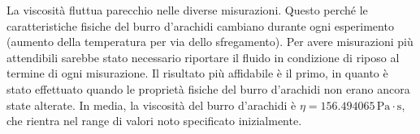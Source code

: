 La viscosit\`{a} fluttua parecchio nelle diverse misurazioni. Questo perch\'{e} le caratteristiche fisiche del burro d'arachidi 
cambiano durante ogni esperimento (aumento della temperatura per via dello sfregamento). Per avere misurazioni pi\`{u} attendibili 
sarebbe stato necessario riportare il fluido in condizione di riposo al termine di ogni misurazione. Il risultato pi\`{u} affidabile 
\`{e} il primo, in quanto \`{e} stato effettuato quando le propriet\`{a} fisiche del burro d'arachidi non erano ancora 
state alterate.
In media, la viscosit\`{a} del burro d'arachidi \`{e} $\eta = 156.494065 \, \text{Pa} \cdot \text{s}$, che rientra nel range di 
valori noto specificato inizialmente. 
